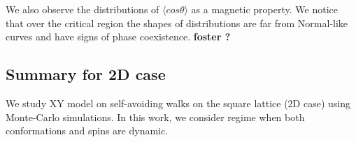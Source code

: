 

%
%
%

We also observe the distributions of $\langle cos \theta \rangle$ as a magnetic property. We notice that over the critical region the shapes of distributions are far from Normal-like curves and have signs of phase coexistence. \textbf{foster ?}



\subsection{Summary for 2D case}
We study XY model on self-avoiding walks on the square lattice (2D case) using Monte-Carlo simulations. In this work, we consider regime when both conformations and spins are dynamic. %
%




